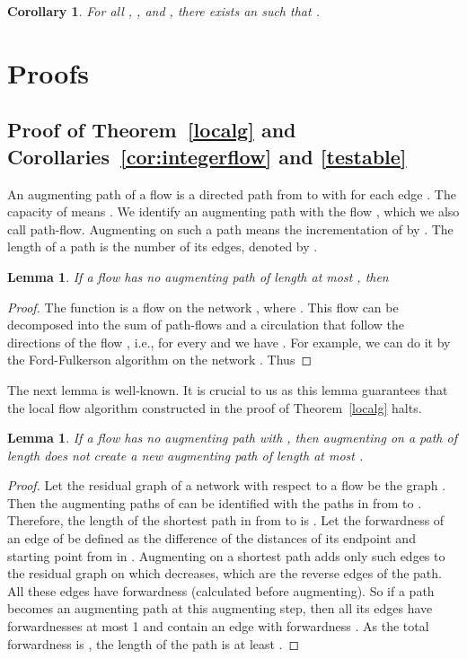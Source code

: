 \documentclass[12pt,a4paper]{article}
\newtheorem{Lemma}[Theorem]{Lemma}
\newtheorem{Corollary}[Theorem]{Corollary}
\renewcommand{\:}{\colon}
\begin{document}
\begin{Corollary} \label{smallgraph}
For all , , and , there exists an  such that . \end{Corollary}


\section{Proofs}

\subsection{Proof of Theorem~\ref{localg} and Corollaries~\ref{cor:integerflow} and \ref{testable}}

An augmenting path of a flow  is a directed path  from  to  with  for each edge . The capacity of  means . We identify an augmenting path  with the flow , 
which we also call path-flow. Augmenting on such a path  means the incrementation of  by . 
The length of a path  is the number of its edges, denoted by . 

\begin{Lemma} \label{approx1}
If a flow  has no augmenting path of length at most , then

\end{Lemma}

\begin{proof}
The function  is a flow on the network , where . 
This flow can be decomposed into the sum of path-flows  and a circulation  that follow the directions of the flow , i.e., for every  and  we have . 
For example, we can do it by the Ford-Fulkerson algorithm \cite{FoFu} on the network . 
Thus


\end{proof}

The next lemma is well-known. 
It is crucial to us as this lemma guarantees that the local flow algorithm constructed in the proof of Theorem~\ref{localg} halts. 

\begin{Lemma}\label{lem:nonewshort}
If a flow  has no augmenting path  with , then augmenting on a path of length  does not create a new augmenting path of length at most .
\end{Lemma}

\begin{proof}
Let the residual graph of a network  with respect to a flow  be the graph . 
Then the augmenting paths of  can be identified with the paths in  from  to . 
Therefore, the length of the shortest path in  from  to  is . 
Let the forwardness of an edge of  be defined as the difference of the distances of its endpoint and starting point from  in . 
Augmenting on a shortest path adds only such edges to the residual graph on which  decreases, which are the reverse edges of the path. 
All these edges have forwardness  (calculated before augmenting). 
So if a path becomes an augmenting path at this augmenting step, then all its edges have forwardnesses at most 1 and contain an edge with forwardness . 
As the total forwardness is , the length of the path is at least . 
\end{proof}
\end{document}
